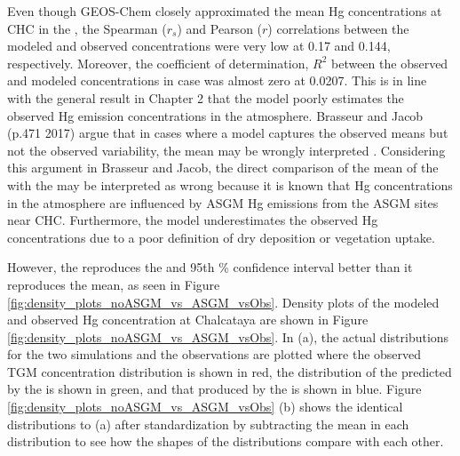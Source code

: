 \begin{flushleft}
    Even though GEOS-Chem closely approximated the mean Hg concentrations at CHC in the \off, the Spearman ($r_s$) and Pearson ($r$) correlations between the modeled and observed concentrations were very low at 0.17 and 0.144, respectively. Moreover, the coefficient of determination, $R^2$ between the observed and modeled concentrations in \off case was almost zero at 0.0207. This is in line with the general result in Chapter 2 that the model poorly estimates the observed Hg emission concentrations in the atmosphere. Brasseur and Jacob (p.471 2017) argue that in cases where a model captures the observed means but not the observed variability, the mean may be wrongly interpreted \cite{brasseur_modeling_2017}. Considering this argument in Brasseur and Jacob, the direct comparison of the mean of the \off with the \obsC may be interpreted as wrong because it is known that Hg concentrations in the atmosphere are influenced by ASGM Hg emissions from the ASGM sites near CHC. Furthermore, the model underestimates the observed Hg concentrations due to a poor definition of dry deposition or vegetation uptake.  
\end{flushleft}

\begin{flushleft}
However, the \on reproduces the \iq and 95th \% confidence interval better than it reproduces the mean, as seen in Figure \ref{fig:density_plots_noASGM_vs_ASGM_vsObs}. Density plots of the modeled and observed Hg concentration at Chalcataya are shown in Figure \ref{fig:density_plots_noASGM_vs_ASGM_vsObs}. In (a), the actual distributions for the two simulations and the observations are plotted where the observed TGM concentration distribution is shown in red, the distribution of the \hgc predicted by the \off is shown in green, and that produced by the \on is shown in blue. Figure \ref{fig:density_plots_noASGM_vs_ASGM_vsObs} (b) shows the identical distributions to (a) after standardization by subtracting the mean in each distribution to see how the shapes of the distributions compare with each other.  
\end{flushleft}



